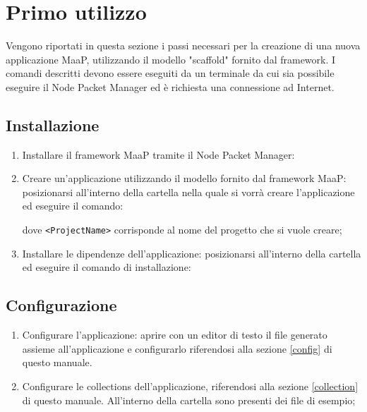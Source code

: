 \section{Primo utilizzo}

Vengono riportati in questa sezione i passi necessari per la creazione di una nuova applicazione MaaP, utilizzando il modello "scaffold" fornito dal framework. I comandi descritti devono essere eseguiti da un terminale da cui sia possibile eseguire il Node Packet Manager ed è richiesta una connessione ad Internet.

\subsection{Installazione}

\begin{enumerate}
 	\item Installare il framework MaaP tramite il Node Packet Manager:
 	
 	\centerline{  }
 	
 	\item Creare un'applicazione utilizzando il modello fornito dal framework MaaP: posizionarsi all'interno della cartella nella quale si vorrà creare l'applicazione ed eseguire il comando:
 	
 	\centerline{  }
 
 	dove \texttt{<ProjectName>} corrisponde al nome del progetto che si vuole creare;
 	
 	\item Installare le dipendenze dell'applicazione: posizionarsi all'interno della cartella ed eseguire il comando di installazione:
 
 	\centerline{  }
 	\centerline{  }
 	
\end{enumerate}

\subsection{Configurazione}

\begin{enumerate}

 	\item Configurare l'applicazione: aprire con un editor di testo il file  generato assieme all'applicazione e configurarlo riferendosi alla sezione \ref{config} di questo manuale.

 	\item Configurare le collections dell'applicazione, riferendosi alla sezione \ref{collection} di questo manuale. All'interno della cartella  sono presenti dei file  di esempio;

\end{enumerate} 

